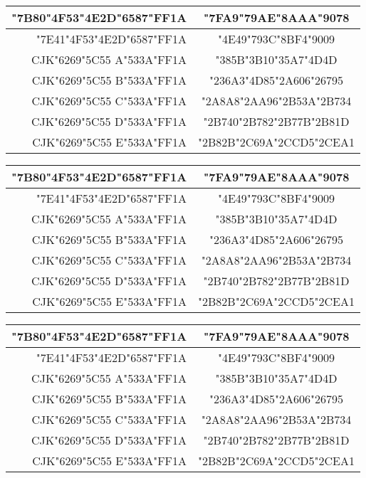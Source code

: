 \documentclass[10pt]{book}
\newcommand{\teststring}{%
\begin{tabular}{|r|c|}
	\hline
	\char"7B80\char"4F53\char"4E2D\char"6587\char"FF1A & 
	\char"7FA9\char"79AE\char"8AAA\char"9078 \\ \hline
	\char"7E41\char"4F53\char"4E2D\char"6587\char"FF1A & 
	\char"4E49\char"793C\char"8BF4\char"9009 \\ \hline
	CJK\char"6269\char"5C55 A\char"533A\char"FF1A & 
	\char"385B\char"3B10\char"35A7\char"4D4D \\ \hline
	CJK\char"6269\char"5C55 B\char"533A\char"FF1A & 
	\char"236A3\char"4D85\char"2A606\char"26795 \\ \hline
	CJK\char"6269\char"5C55 C\char"533A\char"FF1A & 
	\char"2A8A8\char"2AA96\char"2B53A\char"2B734 \\ \hline
	CJK\char"6269\char"5C55 D\char"533A\char"FF1A & 
	\char"2B740\char"2B782\char"2B77B\char"2B81D \\ \hline
	CJK\char"6269\char"5C55 E\char"533A\char"FF1A & 
	\char"2B82B\char"2C69A\char"2CCD5\char"2CEA1 \\ \hline
\end{tabular}}
\begin{document}
	
\noindent\mingti \teststring
\quad
\FZKai \teststring

\noindent\ZHSong \teststring
\end{document}
